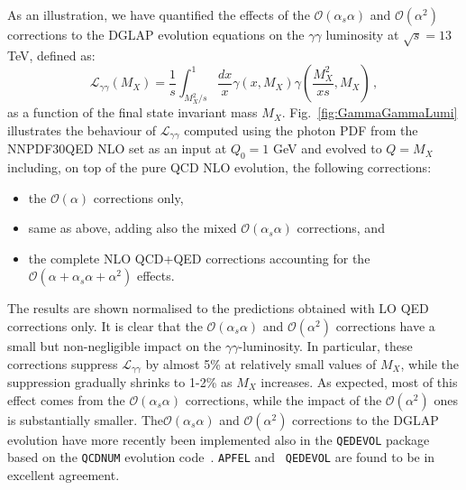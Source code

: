 As an illustration, we have quantified the effects of the
$\mathcal{O}(\alpha_s\alpha)$ and $\mathcal{O}(\alpha^2)$ corrections
to the DGLAP evolution equations on the $\gamma\gamma$ luminosity at
$\sqrt{s} = 13$ TeV, defined as:
\begin{equation}\label{eq:GammaGammaLumi}
\mathcal{L}_{\gamma\gamma}(M_X) = \frac1{s}\int_{M_X^2/s}^1
\frac{dx}{x} \gamma(x,M_X) \gamma\left(\frac{M_X^2}{xs},M_X\right)\,,
\end{equation}
as a function of the final state invariant mass $M_X$.
%
Fig.~\ref{fig:GammaGammaLumi} illustrates the behaviour of
$\mathcal{L}_{\gamma\gamma}$ computed using the photon PDF from the
NNPDF30QED NLO set as an input at $Q_0 = 1$ GeV and evolved to $Q=M_X$
including, on top of the pure QCD NLO evolution, the following
corrections:
\begin{itemize}
\item the $\mathcal{O}(\alpha)$ corrections only,
\item same as above, adding also the mixed
  $\mathcal{O}(\alpha_s\alpha)$ corrections, and
\item the complete NLO QCD+QED corrections accounting for the
  $\mathcal{O}(\alpha+\alpha_s\alpha+\alpha^2)$ effects.
\end{itemize}
The results are shown normalised to the predictions obtained with LO
QED corrections only.
%
It is clear that the $\mathcal{O}(\alpha_s\alpha)$ and
$\mathcal{O}(\alpha^2)$ corrections have a small but non-negligible
impact on the $\gamma\gamma$-luminosity. In particular, these
corrections suppress $\mathcal{L}_{\gamma\gamma}$ by almost 5\% at
relatively small values of $M_X$, while the suppression gradually
shrinks to 1-2\% as $M_X$ increases. As expected, most of this effect
comes from the $\mathcal{O}(\alpha_s\alpha)$ corrections, while the
impact of the $\mathcal{O}(\alpha^2)$ ones is substantially smaller.
The$\mathcal{O}(\alpha_s\alpha)$ and $\mathcal{O}(\alpha^2)$
corrections to the DGLAP evolution have more recently been implemented
also in the {\tt QEDEVOL} package~\cite{Sadykov:2014aua} based on the
{\tt QCDNUM} evolution code~\cite{Botje:2010ay}. {\tt APFEL} and {\tt
  QEDEVOL} are found to be in excellent agreement.


